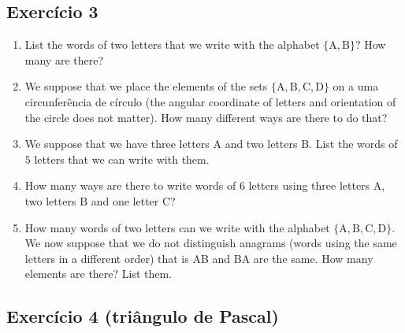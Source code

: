 \subsection*{Exercício 3}
\begin{enumerate}
\item List the words of two letters that we write with the alphabet
  $\{\text{A}, \text{B}\}$? How many are there?
\item
  We suppose that we place the elements of the sets
  $\{\text{A}, \text{B}, \text{C}, \text{D}\}$
  on a uma circunferência de círculo (the angular coordinate of letters and
  orientation of the circle does not matter). How many different ways
  are there to do that?
\item We suppose that we have three letters $\text{A}$ and
  two letters $\text{B}$.
  List the words of $5$ letters that we can write with them.
\item How many ways are there to write words of $6$ letters using
  three letters $\text{A}$, two letters $\text{B}$ and one letter
  $\text{C}$?
\item How many words of two letters can we write with the alphabet
  $\{\text{A}, \text{B}, \text{C}, \text{D}\}$.
  We now suppose that we do not distinguish anagrams
  (words using the same letters in a different order) that is
  AB and BA are the same. How many elements are there? List them.
\end{enumerate}

\subsection*{Exercício 4 (triângulo de Pascal)}

